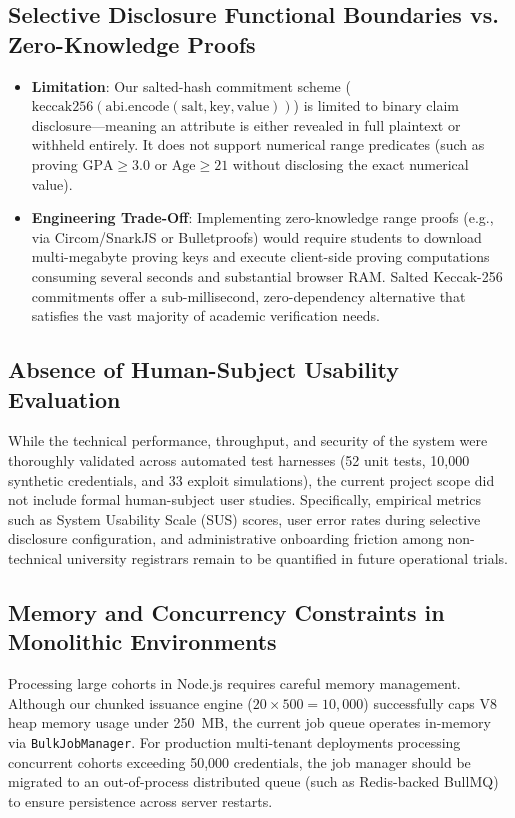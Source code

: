 \subsection{Selective Disclosure Functional Boundaries vs. Zero-Knowledge Proofs}
\begin{itemize}
    \item \textbf{Limitation}: Our salted-hash commitment scheme ($\text{keccak256}(\text{abi.encode}(\text{salt}, \text{key}, \text{value}))$) is limited to binary claim disclosure—meaning an attribute is either revealed in full plaintext or withheld entirely. It does not support numerical range predicates (such as proving $\text{GPA} \ge 3.0$ or $\text{Age} \ge 21$ without disclosing the exact numerical value).
    \item \textbf{Engineering Trade-Off}: Implementing zero-knowledge range proofs (e.g., via Circom/SnarkJS or Bulletproofs) would require students to download multi-megabyte proving keys and execute client-side proving computations consuming several seconds and substantial browser RAM. Salted Keccak-256 commitments offer a sub-millisecond, zero-dependency alternative that satisfies the vast majority of academic verification needs.
\end{itemize}

\subsection{Absence of Human-Subject Usability Evaluation}
While the technical performance, throughput, and security of the system were thoroughly validated across automated test harnesses (52 unit tests, 10,000 synthetic credentials, and 33 exploit simulations), the current project scope did not include formal human-subject user studies. Specifically, empirical metrics such as System Usability Scale (SUS) scores, user error rates during selective disclosure configuration, and administrative onboarding friction among non-technical university registrars remain to be quantified in future operational trials.

\subsection{Memory and Concurrency Constraints in Monolithic Environments}
Processing large cohorts in Node.js requires careful memory management. Although our chunked issuance engine ($20 \times 500 = 10,000$) successfully caps V8 heap memory usage under 250~MB, the current job queue operates in-memory via \texttt{BulkJobManager}. For production multi-tenant deployments processing concurrent cohorts exceeding 50,000 credentials, the job manager should be migrated to an out-of-process distributed queue (such as Redis-backed BullMQ) to ensure persistence across server restarts.

